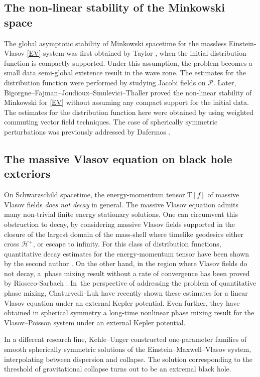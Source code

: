 \documentclass[JEP,XML,SOM,Unicode,published]{cedram}
\theoremstyle{plain}
\theoremstyle{definition}
\begin{document}
\subsection{The non-linear stability of the Minkowski space}

The global asymptotic stability of Minkowski spacetime for the massless Einstein-Vlasov \eqref{EV} system was first obtained by Taylor \cite{T}, when the initial distribution function is compactly supported. Under this assumption, the problem becomes a small data semi-global existence result in the wave zone. The estimates for the distribution function were performed by studying Jacobi fields on $\mathcal{P}$. Later, Bigorgne--Fajman--Joudioux--Smulevici--Thaller \cite{BFJST} proved the non-linear stability of Minkowski for \eqref{EV} without assuming any compact support for the initial data. The estimates for the distribution function here were obtained by using weighted commuting vector field techniques. The case of spherically symmetric perturbations was previously addressed by Dafermos \cite{D06}.

\subsection{The massive Vlasov equation on black hole exteriors}

On Schwarzschild spacetime, the energy-momentum tensor $\mathrm{T}[f]$ of massive Vlasov fields \emph{does not decay} in general. The massive Vlasov equation admits many non-trivial finite energy stationary solutions. One can circumvent this obstruction to decay, by considering massive Vlasov fields supported in the closure of the largest domain of the mass-shell where timelike geodesics either cross $\mathcal{H}^+$, or escape to infinity. For this class of distribution functions, quantitative decay estimates for the energy-momentum tensor have been shown by the second author \cite{V24}. On the other hand, in the region where Vlasov fields do not decay, a~phase mixing result without a rate of convergence has been proved by Rioseco-Sarbach \cite{RS20}. In~the perspective of addressing the problem of quantitative phase mixing, Chaturvedi--Luk \cite{CL24} have recently shown these estimates for a linear Vlasov equation under an external Kepler potential. Even further, they have obtained in spherical symmetry a long-time nonlinear phase mixing result for the Vlasov--Poisson system under an external Kepler potential.

In a different research line, Kehle--Unger \cite{KU24} constructed one-parameter families of smooth spherically symmetric solutions of the Einstein--Maxwell--Vlasov system, interpolating between dispersion and collapse. The solution corresponding to the threshold of gravitational collapse turns out to be an extremal black hole.
\end{document}
